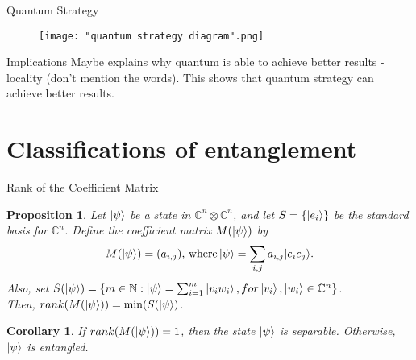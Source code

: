 \documentclass[handout, 10 pt]{beamer}
\newtheorem{prop}{Proposition}
\newtheorem{corol}{Corollary}
\begin{document}

\begin{frame}{Quantum Strategy}
    \begin{figure}[h]
    \centering
    \texttt{[image: "quantum strategy diagram".png]}
    \label{fig: quantum strategy diagram}
\end{figure}
\end{frame}

\begin{frame}{Implications}
Maybe explains why quantum is able to achieve better results - locality (don't mention the words).
This shows that quantum strategy can achieve better results.
\end{frame}

\section{Classifications of entanglement}
\begin{frame}{Rank of the Coefficient Matrix}
\begin{prop}
\label{rank prop}
Let $\ket{\psi}$ be a state in $\mathbb{C}^n \otimes \mathbb{C}^n$, and let $S=\{\ket{e_i}\}$ be the standard basis for $\mathbb{C}^n$. Define the coefficient matrix $M(\ket{\psi})$ by
\begin{equation}
M(\ket{\psi})=(a_{i,j}) \textrm{, where}\ket{\psi}=\sum\limits_{i,j}a_{i,j}|e_i e_j\rangle . 
\end{equation}
Also, set $S(\ket{\psi})=\{m\in \mathbb{N}: \ket{\psi}=\sum_{i=1}^m\ket{v_i w_i}, for \ket{v_i}, \ket{w_i} \in \mathbb{C}^n\}$.\\  Then, $rank(M(\ket{\psi}))=\textrm{min} (S(\ket{\psi})$.
\end{prop}
\pause

\begin{corol}
If $rank(M(\ket{\psi}))=1$, then the state $\ket{\psi}$ is separable. Otherwise, $\ket{\psi}$ is entangled.
\end{corol}
\end{frame}
\end{document}
